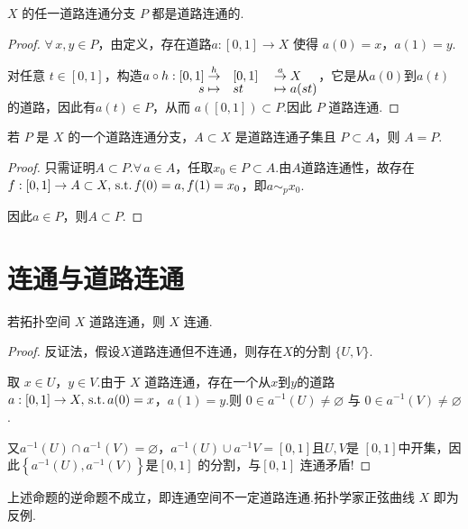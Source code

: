 \begin{lemma}[道路连通分支是道路连通的][lem:7.8]
    $X$ 的任一道路连通分支 $P$ 都是道路连通的.
\end{lemma}
\begin{proof}
    $\forall\, x,y\in P$，由定义，存在道路$a:[0,1]\to X$ 使得 $a(0)=x$，$a(1)=y$.\par
    对任意 $t\in[0,1]$，构造$\setjot[-2]\begin{aligned}[t]
        a\circ h:[0,1] &\stackrel{h}{\to}& &[0,1]& &\stackrel{a}{\to} X \\
        s &\mapsto& &st& &\mapsto a(st)
    \end{aligned}$，它是从$a(0)$到$a(t)$的道路，因此有$a(t)\in P$，从而 $a\left([0,1]\right)\subset P$.因此 $P$ 道路连通.
\end{proof}

\begin{lemma}[道路连通分支的极大性][lem:7.9]
    若 $P$ 是 $X$ 的一个道路连通分支，$A\subset X$ 是道路连通子集且 $P\subset A$，则 $A=P$.
\end{lemma}
\begin{proof}
    只需证明$A\subset P$.$\forall\, a\in A$，任取$x_0\in P\subset A$.由$A$道路连通性，故存在$f:[0,1]\to A\subset X,\operatorname{\,\text{s.t.}} f(0)=a,f(1)=x_0$，即$a\sim_p x_0$.\par
    因此$a\in P$，则$A\subset P$.
\end{proof}



\section{连通与道路连通}

\begin{proposition}[道路连通必连通][prop:7.5]
    若拓扑空间 $X$ 道路连通，则 $X$ 连通.
\end{proposition}
\begin{proof}
    反证法，假设$X$道路连通但不连通，则存在$X$的分割 $\{U,V\}$.\par
    取 $x\in U$，$y\in V$.由于 $X$ 道路连通，存在一个从$x$到$y$的道路 $a:[0,1]\to X,\operatorname{\,\text{s.t.}} a(0)=x$，$a(1)=y$.则 $0\in a^{-1}(U)\neq\varnothing$ 与 $0\in a^{-1}(V)\neq\varnothing$.\par
    又$a^{-1}(U)\cap a^{-1}(V)=\varnothing$，$a^{-1}(U)\cup a^{-1}V=[0,1]$且$U,V$是 $[0,1]$中开集，因此$\left\{a^{-1}(U),a^{-1}(V)\right\}$是$[0,1]$ 的分割，与$[0,1]$ 连通矛盾!
\end{proof}
\begin{remark}
    上述命题的逆命题不成立，即连通空间不一定道路连通.拓扑学家正弦曲线 $X$ 即为反例.
\end{remark}

